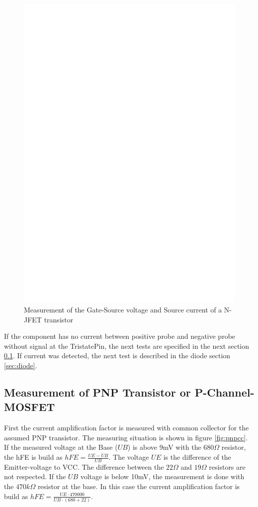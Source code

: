 \begin{figure}[H]
\centering
\includegraphics[]{../FIG/JFETcd.eps}
\caption{Measurement of the  Gate-Source voltage and Source current of a N-JFET transistor}
\label{fig:JFETcd}
\end{figure}

If the component has no current between positive probe and negative probe without signal at the
TristatePin, the next tests are specified in the next section \ref{sec:pnp}.
If current was detected, the next test is described in the diode section \ref{sec:diode}.

\subsection{Measurement of PNP Transistor or P-Channel-MOSFET}
\label{sec:pnp}
First the current amplification factor is measured with common collector for the assumed PNP transistor.
The measuring situation is shown in figure \ref{fig:pnpcc}.
If the measured voltage at the Base (\(UB\)) is above 9mV with the \(680\Omega\) resistor,
the hFE is build as \(hFE = \frac{UE-UB}{UB}\). The voltage \(UE\) is the difference of the Emitter-voltage to VCC.
The difference between the \(22\Omega\) and \(19\Omega\) resistors are not respected.
If the \(UB\) voltage is below 10mV, the measurement is done with the \(470k\Omega\) resistor at the base.
In this case the current amplification factor is build as \(hFE = \frac{UE \cdot 470000}{UB \cdot (680+22)}\).

